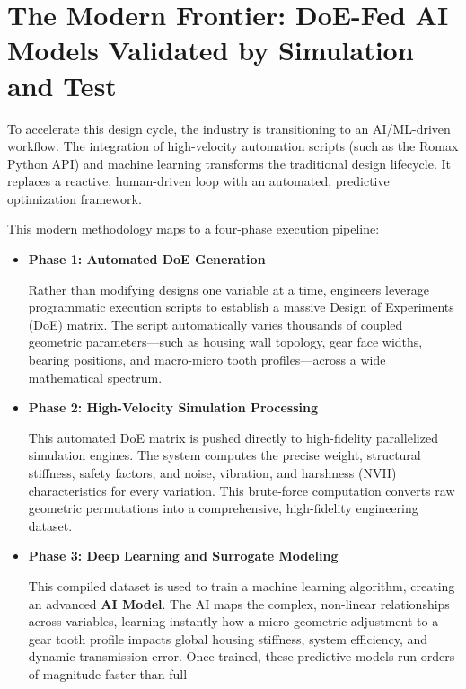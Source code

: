 \section{The Modern Frontier: DoE-Fed AI Models Validated by Simulation and Test}
    To accelerate this design cycle, the industry is transitioning to an AI/ML-driven workflow. 
    The integration of high-velocity automation scripts (such as the Romax Python API) and machine 
    learning transforms the traditional design lifecycle. It replaces a reactive, human-driven loop 
    with an automated, predictive optimization framework.

    This modern methodology maps to a four-phase execution pipeline:
        \begin{itemize}
            \item \textbf{Phase 1: Automated DoE Generation}\par
                Rather than modifying designs one variable at a time, engineers leverage programmatic 
                execution scripts to establish a massive Design of Experiments (DoE) matrix. 
                The script automatically varies thousands of coupled geometric parameters—such as 
                housing wall topology, gear face widths, bearing positions, and macro-micro tooth 
                profiles—across a wide mathematical spectrum.
            \item \textbf{Phase 2: High-Velocity Simulation Processing}\par
                This automated DoE matrix is pushed directly to high-fidelity parallelized simulation 
                engines. The system computes the precise weight, structural stiffness, safety factors, 
                and noise, vibration, and harshness (NVH) characteristics for every variation. 
                This brute-force computation converts raw geometric permutations into a comprehensive, 
                high-fidelity engineering dataset.
            \item \textbf{Phase 3: Deep Learning and Surrogate Modeling}\par
                This compiled dataset is used to train a machine learning algorithm, creating an 
                advanced \textbf{AI Model}. The AI maps the complex, non-linear relationships across variables, 
                learning instantly how a micro-geometric adjustment to a gear tooth profile impacts 
                global housing stiffness, system efficiency, and dynamic transmission error. 
                Once trained, these predictive models run orders of magnitude faster than full 

\end{itemize}
